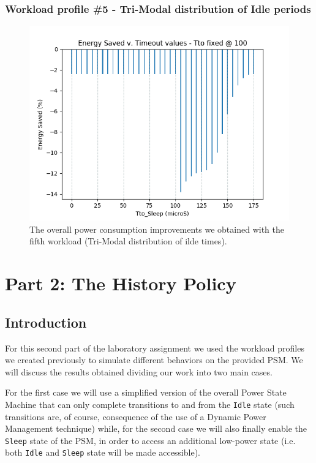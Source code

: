 \documentclass[a4paper]{article}
\begin{document}
        \subsubsection{Workload profile \#5 - Tri-Modal distribution of Idle periods}
        \begin{figure}[htp]
            \centering
            \includegraphics[width=0.6 \columnwidth]{./screenshots/Sleep_case5.png}
            \caption{
                    \label{fig:Sleep_case5}
                    The overall power consumption improvements we obtained with the fifth workload (Tri-Modal distribution of ilde times).
            }
        \end{figure}

%
%
\section{Part 2: The History Policy}
    \subsection{Introduction}
        For this second part of the laboratory assignment we used the workload profiles we created previously to simulate different behaviors on the provided PSM. We will discuss the results obtained dividing our work into two main cases.

        For the first case we will use a simplified version of the overall Power State Machine that can only complete transitions to and from the \texttt{Idle} state (such transitions are, of course, consequence of the use of a Dynamic Power Management technique) while, for the second case we will also finally enable the \texttt{Sleep} state of the PSM, in order to access an additional low-power state (i.e. both \texttt{Idle} and \texttt{Sleep} state will be made accessible).
\end{document}
